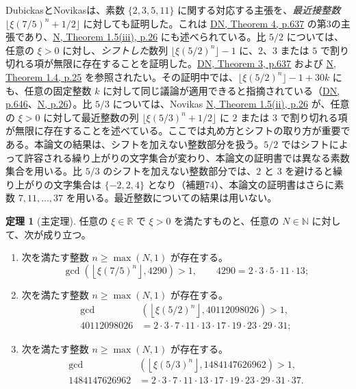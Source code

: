 \documentclass[11pt,reqno]{amsart}
\theoremstyle{definition}
\newtheorem{theorem}{定理}
\theoremstyle{definition}
\theoremstyle{remark}
\begin{document}
DubickasとNovikasは、素数 \(\{2,3,5,11\}\) に関する対応する主張を、\emph{最近接整数}
\(\lfloor\xi(7/5)^n+1/2\rfloor\)
に対しても証明した。これは \hyperref[ref-dn]{DN, Theorem 4, p.637} の第3の主張であり、\hyperref[ref-n]{N, Theorem 1.5(iii), p.26} にも述べられている。比 \(5/2\) については、任意の \(\xi>0\) に対し、\emph{シフトした}数列 \(\lfloor\xi(5/2)^n\rfloor-1\) に、\(2\)、\(3\) または \(5\) で割り切れる項が無限に存在することを証明した。\hyperref[ref-dn]{DN, Theorem 3, p.637} および \hyperref[ref-n]{N, Theorem 1.4, p.25} を参照されたい。その証明中では、\(\lfloor\xi(5/2)^n\rfloor-1+30k\) にも、任意の固定整数 \(k\) に対して同じ議論が適用できると指摘されている（\hyperref[ref-dn]{DN, p.646}、\hyperref[ref-n]{N, p.26}）。比 \(5/3\) については、Novikas \hyperref[ref-n]{N, Theorem 1.5(ii), p.26} が、任意の \(\xi>0\) に対して最近整数の列 \(\lfloor\xi(5/3)^n+1/2\rfloor\) に \(2\) または \(3\) で割り切れる項が無限に存在することを述べている。ここでは丸め方とシフトの取り方が重要である。本論文の結果は、シフトを加えない整数部分を扱う。\(5/2\) ではシフトによって許容される繰り上がりの文字集合が変わり、本論文の証明書では異なる素数集合を用いる。比 \(5/3\) のシフトを加えない整数部分では、\(2\) と \(3\) を避けると繰り上がりの文字集合は \(\{-2,2,4\}\) となり（補題74）、本論文の証明書はさらに素数 \(7,11,\ldots,37\) を用いる。最近整数についての結果は用いない。

\begin{samepage}
\begin{theorem}[主定理]\leavevmode\label{thm:1}
任意の \(\xi\in\mathbb R\) で \(\xi>0\) を満たすものと、任意の \(N\in\mathbb N\) に対して、次が成り立つ。

\begin{enumerate}
\def\labelenumi{(\roman{enumi})}
\item
  次を満たす整数 \(n\ge\max(N,1)\) が存在する。
  \[
  \gcd\!\left(\left\lfloor\xi(7/5)^n\right\rfloor,4290\right)>1,
  \qquad 4290=2\cdot3\cdot5\cdot11\cdot13;
  \tag{1}\label{eq:1}
  \]
\item
  次を満たす整数 \(n\ge\max(N,1)\) が存在する。
  \[
  \begin{aligned}
  \gcd\!&\left(\left\lfloor\xi(5/2)^n\right\rfloor,40112098026\right)>1,\\
  40112098026&=2\cdot3\cdot7\cdot11\cdot13\cdot17\cdot19\cdot23\cdot29\cdot31;
  \end{aligned}
  \tag{2}\label{eq:2}
  \]
\item
  次を満たす整数 \(n\ge\max(N,1)\) が存在する。
  \[
  \begin{aligned}
  \gcd\!&\left(\left\lfloor\xi(5/3)^n\right\rfloor,1484147626962\right)>1,\\
  1484147626962&=2\cdot3\cdot7\cdot11\cdot13\cdot17\cdot19\cdot23\cdot29\cdot31\cdot37.
  \end{aligned}
  \tag{2a}\label{eq:2a}
  \]
\end{enumerate}
\label{thm-end:1}
\end{theorem}
\end{samepage}
\end{document}
